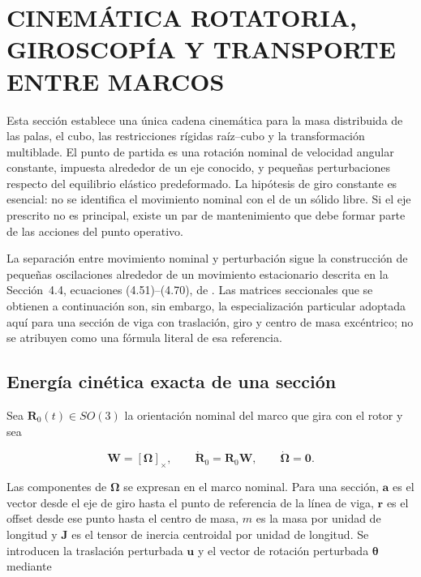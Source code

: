 \section[GIROSCOPÍA Y TRANSFORMACIONES CINEMÁTICAS]{CINEMÁTICA ROTATORIA, GIROSCOPÍA Y TRANSPORTE ENTRE MARCOS}
\label{prefgyro:section}

Esta sección establece una única cadena cinemática para la masa distribuida de
las palas, el cubo, las restricciones rígidas raíz--cubo y la transformación
multiblade. El punto de partida es una rotación nominal de velocidad angular
constante, impuesta alrededor de un eje conocido, y pequeñas perturbaciones
respecto del equilibrio elástico predeformado. La hipótesis de giro constante es
esencial: no se identifica el movimiento nominal con el de un sólido libre. Si
el eje prescrito no es principal, existe un par de mantenimiento que debe formar
parte de las acciones del punto operativo.

La separación entre movimiento nominal y perturbación sigue la construcción de
pequeñas oscilaciones alrededor de un movimiento estacionario descrita en la
Sección~4.4, ecuaciones (4.51)--(4.70), de \citet{meirovitch1997}. Las matrices
seccionales que se obtienen a continuación son, sin embargo, la especialización
particular adoptada aquí para una sección de viga con traslación, giro y centro
de masa excéntrico; no se atribuyen como una fórmula literal de esa referencia.

\subsection{Energía cinética exacta de una sección}
\label{prefgyro:exacta}

Sea $\bm R_0(t)\in SO(3)$ la orientación nominal del marco que gira con el
rotor y sea

\begin{equation}
 \bm W=[\bm\Omega]_\times,
 \qquad
 \dot{\bm R}_0=\bm R_0\bm W,
 \qquad
 \dot{\bm\Omega}=\bm 0 .
 \label{prefgyro:W}
\end{equation}

Las componentes de $\bm\Omega$ se expresan en el marco nominal. Para una
sección, $\bm a$ es el vector desde el eje de giro hasta el punto de referencia
de la línea de viga, $\bm r$ es el offset desde ese punto hasta el centro de
masa, $m$ es la masa por unidad de longitud y $\bm J$ es el tensor de inercia
centroidal por unidad de longitud. Se introducen la traslación perturbada
$\bm u$ y el vector de rotación perturbada $\bm\theta$ mediante

